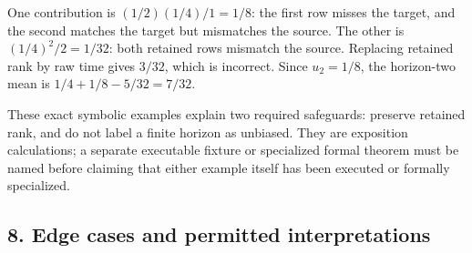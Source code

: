 One contribution is \((1/2)(1/4)/1=1/8\): the first row misses the target, and the second matches the target but mismatches the source. The other is \((1/4)^2/2=1/32\): both retained rows mismatch the source. Replacing retained rank by raw time gives \(3/32\), which is incorrect. Since \(u_2=1/8\), the horizon-two mean is \(1/4+1/8-5/32=7/32\).

These exact symbolic examples explain two required safeguards: preserve retained rank, and do not label a finite horizon as unbiased. They are exposition calculations; a separate executable fixture or specialized formal theorem must be named before claiming that either example itself has been executed or formally specialized.

\subsection{8. Edge cases and permitted interpretations}\label{edge-cases-and-permitted-interpretations}

